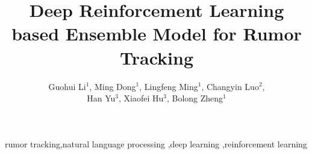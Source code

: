 \documentclass[review]{elsarticle}
\begin{document}
\begin{frontmatter}

\title{Deep Reinforcement Learning based Ensemble Model for Rumor Tracking}

\author{Guohui Li$^1$, Ming Dong$^1$, Lingfeng Ming$^1$, Changyin Luo$^2$,\\Han Yu$^3$, Xiaofei Hu$^3$, Bolong Zheng$^1$}
\address{$^1$Huazhong University of Science and Technology, Wuhan, China}
\address{$^2$Central China Normal University, Wuhan, China}
\address{$^3$Wuhan Fiberhome Technical Services Co.,Ltd, Wuhan, China}




\begin{keyword}
rumor tracking\sep natural language processing \sep deep learning \sep reinforcement learning
\end{keyword}

\end{frontmatter}

\linenumbers









\end{document}
